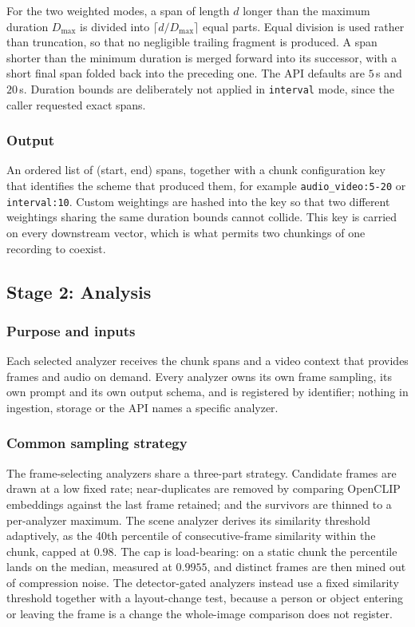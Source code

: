 For the two weighted modes, a span of length $d$ longer than the maximum duration
$D_{\max}$ is divided into $\lceil d / D_{\max} \rceil$ equal parts. Equal division is
used rather than truncation, so that no negligible trailing fragment is produced. A
span shorter than the minimum duration is merged forward into its successor, with a
short final span folded back into the preceding one. The API defaults are $5$\,s and
$20$\,s.
Duration bounds are deliberately not applied in \texttt{interval} mode, since the
caller requested exact spans.

\subsubsection*{Output}

An ordered list of (start, end) spans, together with a chunk
configuration key that identifies the scheme that produced them, for example
\texttt{audio\_video:5-20} or \texttt{interval:10}. Custom weightings are hashed into
the key so that two different weightings sharing the same duration bounds cannot
collide. This key is carried on every downstream vector, which is what permits two
chunkings of one recording to coexist.

\subsection{Stage 2: Analysis}

\subsubsection*{Purpose and inputs}

Each selected analyzer receives the chunk spans and a video context that provides
frames and audio on demand. Every analyzer owns its own frame sampling, its own prompt
and its own output schema, and is registered by identifier; nothing in ingestion,
storage or the API names a specific analyzer.

\subsubsection*{Common sampling strategy}

The frame-selecting analyzers share a three-part strategy. Candidate frames are drawn
at a low fixed rate; near-duplicates are removed by comparing OpenCLIP embeddings
against the last frame retained; and the survivors are thinned to a per-analyzer
maximum. The scene analyzer derives its similarity threshold adaptively, as the
40th percentile of consecutive-frame similarity within the chunk, capped at
$0.98$. The cap is load-bearing: on a static chunk the percentile lands on the median,
measured at $0.9955$, and distinct frames are then mined out of compression noise. The
detector-gated analyzers instead use a fixed similarity threshold together with a
layout-change test, because a person or object entering or leaving the frame is a
change the whole-image comparison does not register.

